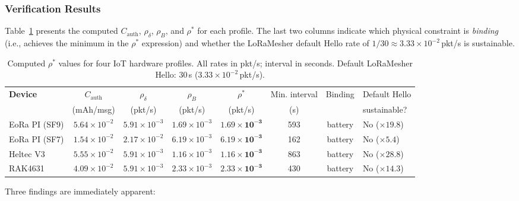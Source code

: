 \subsubsection{Verification Results}
\label{subsubsec:verification-results}

Table~\ref{tab:rho-star-results} presents the computed $C_{\mathrm{auth}}$,
$\rho_\delta$, $\rho_B$, and $\rho^*$ for each profile.  The last two
columns indicate which physical constraint is \emph{binding} (i.e., achieves
the minimum in the $\rho^*$ expression) and whether the LoRaMesher default
Hello rate of $1/30 \approx 3.33 \times 10^{-2}$\,pkt/s is sustainable.

\begin{table}[ht]
\centering
\caption{%
  Computed $\rho^*$ values for four IoT hardware profiles.
  All rates in pkt/s; interval in seconds.
  Default LoRaMesher Hello: 30\,s ($3.33 \times 10^{-2}$\,pkt/s).}
\label{tab:rho-star-results}
\small
\setlength{\tabcolsep}{4pt}
\begin{tabular}{@{}lccccccl@{}}
\toprule
\textbf{Device} &
  $C_{\mathrm{auth}}$ &
  $\rho_\delta$ &
  $\rho_B$ &
  $\rho^*$ &
  Min. interval &
  Binding &
  Default Hello \\
  & (mAh/msg) & (pkt/s) & (pkt/s) & (pkt/s) & (s) & & sustainable? \\
\midrule
EoRa PI (SF9)     &
  $5.64 \times 10^{-2}$ &
  $5.91 \times 10^{-3}$ &
  $1.69 \times 10^{-3}$ &
  $\mathbf{1.69 \times 10^{-3}}$ &
  593 &
  battery &
  No ($\times 19.8$) \\[2pt]
EoRa PI (SF7)     &
  $1.54 \times 10^{-2}$ &
  $2.17 \times 10^{-2}$ &
  $6.19 \times 10^{-3}$ &
  $\mathbf{6.19 \times 10^{-3}}$ &
  162 &
  battery &
  No ($\times 5.4$) \\[2pt]
Heltec V3         &
  $5.55 \times 10^{-2}$ &
  $5.91 \times 10^{-3}$ &
  $1.16 \times 10^{-3}$ &
  $\mathbf{1.16 \times 10^{-3}}$ &
  863 &
  battery &
  No ($\times 28.8$) \\[2pt]
RAK4631           &
  $4.09 \times 10^{-2}$ &
  $5.91 \times 10^{-3}$ &
  $2.33 \times 10^{-3}$ &
  $\mathbf{2.33 \times 10^{-3}}$ &
  430 &
  battery &
  No ($\times 14.3$) \\
\bottomrule
\end{tabular}
\end{table}

\noindent
Three findings are immediately apparent:

